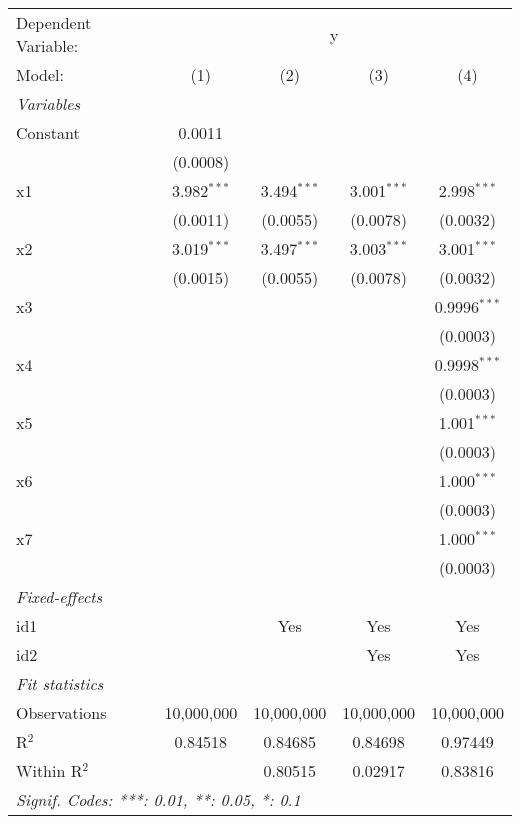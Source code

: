 
\begingroup
\centering
\begin{tabular}{lcccc}
   \tabularnewline \midrule \midrule
   Dependent Variable: & \multicolumn{4}{c}{y}\\
   Model:       & (1)           & (2)           & (3)           & (4)\\  
   \midrule
   \emph{Variables}\\
   Constant     & 0.0011        &               &               &   \\   
                & (0.0008)      &               &               &   \\   
   x1           & 3.982$^{***}$ & 3.494$^{***}$ & 3.001$^{***}$ & 2.998$^{***}$\\   
                & (0.0011)      & (0.0055)      & (0.0078)      & (0.0032)\\   
   x2           & 3.019$^{***}$ & 3.497$^{***}$ & 3.003$^{***}$ & 3.001$^{***}$\\   
                & (0.0015)      & (0.0055)      & (0.0078)      & (0.0032)\\   
   x3           &               &               &               & 0.9996$^{***}$\\   
                &               &               &               & (0.0003)\\   
   x4           &               &               &               & 0.9998$^{***}$\\   
                &               &               &               & (0.0003)\\   
   x5           &               &               &               & 1.001$^{***}$\\   
                &               &               &               & (0.0003)\\   
   x6           &               &               &               & 1.000$^{***}$\\   
                &               &               &               & (0.0003)\\   
   x7           &               &               &               & 1.000$^{***}$\\   
                &               &               &               & (0.0003)\\   
   \midrule
   \emph{Fixed-effects}\\
   id1          &               & Yes           & Yes           & Yes\\  
   id2          &               &               & Yes           & Yes\\  
   \midrule
   \emph{Fit statistics}\\
   Observations & 10,000,000    & 10,000,000    & 10,000,000    & 10,000,000\\  
   R$^2$        & 0.84518       & 0.84685       & 0.84698       & 0.97449\\  
   Within R$^2$ &               & 0.80515       & 0.02917       & 0.83816\\  
   \midrule \midrule
   \multicolumn{5}{l}{\emph{Signif. Codes: ***: 0.01, **: 0.05, *: 0.1}}\\
\end{tabular}
\par\endgroup


